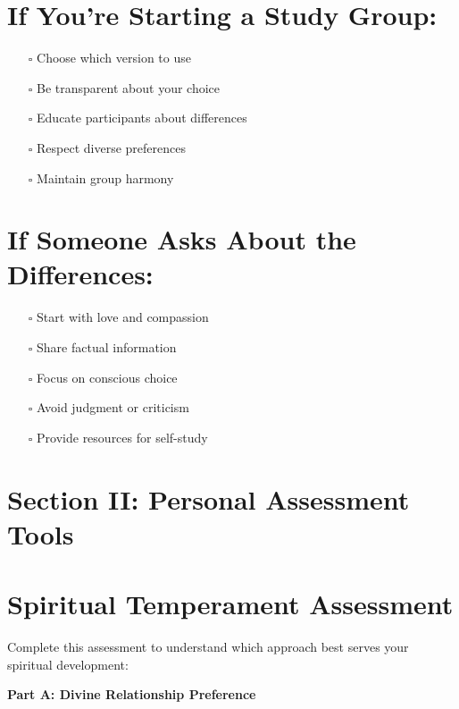 \documentclass[11pt,twoside]{book}
\begin{document}
\section*{If You're Starting a Study Group:}
\label{sec:orgbc922b0}
\begin{itemize}
\item[{$\square$}] Choose which version to use
\item[{$\square$}] Be transparent about your choice
\item[{$\square$}] Educate participants about differences
\item[{$\square$}] Respect diverse preferences
\item[{$\square$}] Maintain group harmony
\end{itemize}
\section*{If Someone Asks About the Differences:}
\label{sec:org9a438b1}
\begin{itemize}
\item[{$\square$}] Start with love and compassion
\item[{$\square$}] Share factual information
\item[{$\square$}] Focus on conscious choice
\item[{$\square$}] Avoid judgment or criticism
\item[{$\square$}] Provide resources for self-study
\end{itemize}
\section*{Section II: Personal Assessment Tools}
\label{sec:org3070813}

\section*{Spiritual Temperament Assessment}
\label{sec:org0125e7d}

Complete this assessment to understand which approach best serves your spiritual development:

\textbf{\textbf{Part A: Divine Relationship Preference}}
\end{document}
